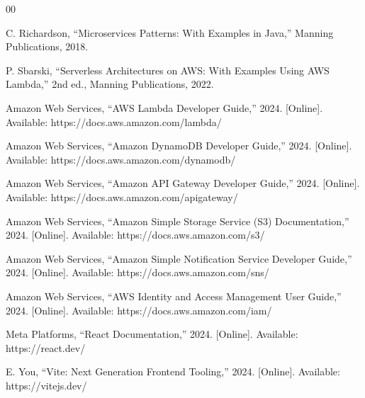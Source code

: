 \documentclass[conference]{IEEEtran}
\begin{document}
\begin{thebibliography}{00}

 C. Richardson, ``Microservices Patterns: With Examples in Java,'' Manning Publications, 2018.

 P. Sbarski, ``Serverless Architectures on AWS: With Examples Using AWS Lambda,'' 2nd ed., Manning Publications, 2022.

 Amazon Web Services, ``AWS Lambda Developer Guide,'' 2024. [Online]. Available: https://docs.aws.amazon.com/lambda/

 Amazon Web Services, ``Amazon DynamoDB Developer Guide,'' 2024. [Online]. Available: https://docs.aws.amazon.com/dynamodb/

 Amazon Web Services, ``Amazon API Gateway Developer Guide,'' 2024. [Online]. Available: https://docs.aws.amazon.com/apigateway/

 Amazon Web Services, ``Amazon Simple Storage Service (S3) Documentation,'' 2024. [Online]. Available: https://docs.aws.amazon.com/s3/

 Amazon Web Services, ``Amazon Simple Notification Service Developer Guide,'' 2024. [Online]. Available: https://docs.aws.amazon.com/sns/

 Amazon Web Services, ``AWS Identity and Access Management User Guide,'' 2024. [Online]. Available: https://docs.aws.amazon.com/iam/

 Meta Platforms, ``React Documentation,'' 2024. [Online]. Available: https://react.dev/

 E. You, ``Vite: Next Generation Frontend Tooling,'' 2024. [Online]. Available: https://vitejs.dev/

\end{thebibliography}
\end{document}
